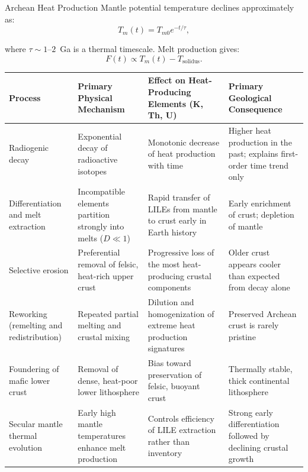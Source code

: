 \begin{activity}{Archean Heat Production}
Mantle potential temperature declines approximately as:
\[
T_m(t) = T_{m0} e^{-t/\tau},
\]

where \(\tau \sim 1\text{--}2\)~Ga is a thermal timescale.
Melt production gives:
\[
F(t) \propto T_m(t) - T_{\text{solidus}}.
\]



\begin{table}[h!]
    \centering
    \begin{tabularx}{\textwidth}{@{}XXXX@{}}
    \toprule
    \textbf{Process} &
    \textbf{Primary Physical Mechanism} &
    \textbf{Effect on Heat-Producing Elements (K, Th, U)} &
    \textbf{Primary Geological Consequence} \\
    \midrule
    Radiogenic decay &
    Exponential decay of radioactive isotopes &
    Monotonic decrease of heat production with time &
    Higher heat production in the past; explains first-order time trend only \\[0.3em]

    Differentiation and melt extraction &
    Incompatible elements partition strongly into melts ($D \ll 1$) &
    Rapid transfer of LILEs from mantle to crust early in Earth history &
    Early enrichment of crust; depletion of mantle \\[0.3em]

    Selective erosion &
    Preferential removal of felsic, heat-rich upper crust &
    Progressive loss of the most heat-producing crustal components &
    Older crust appears cooler than expected from decay alone \\[0.3em]

    Reworking (remelting and redistribution) &
    Repeated partial melting and crustal mixing &
    Dilution and homogenization of extreme heat production signatures &
    Preserved Archean crust is rarely pristine \\[0.3em]

    Foundering of mafic lower crust &
    Removal of dense, heat-poor lower lithosphere &
    Bias toward preservation of felsic, buoyant crust &
    Thermally stable, thick continental lithosphere \\[0.3em]

    Secular mantle thermal evolution &
    Early high mantle temperatures enhance melt production &
    Controls efficiency of LILE extraction rather than inventory &
    Strong early differentiation followed by declining crustal growth \\


\end{tabularx}
\end{table}
\end{activity}
